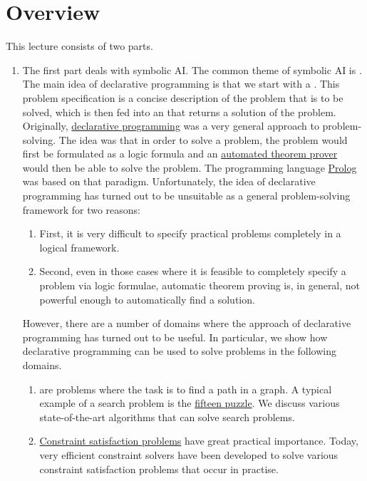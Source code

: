 \section{Overview}
This lecture consists of two parts.
\begin{enumerate}
\item The first part deals with symbolic AI.
      The common theme of symbolic AI is .  
      The main idea of declarative programming is that we start with a .
      This problem specification is a concise description of the problem that is to be solved, which is
      then fed into an  that returns a solution of the problem.  Originally, 
      \href{https://en.wikipedia.org/wiki/Declarative_programming}{declarative programming} was a very general
      approach to problem-solving.  The idea was that in order to solve a problem, the problem would first be
      formulated as a logic formula and an
      \href{https://en.wikipedia.org/wiki/Automated_theorem_proving}{automated theorem prover} would then be
      able to solve the problem.  The programming language \href{https://en.wikipedia.org/wiki/Prolog}{Prolog}
      was based on that paradigm.  Unfortunately, the idea of declarative programming has
      turned out to be unsuitable as a general problem-solving framework for two reasons:
      \begin{enumerate}
      \item First, it is very difficult to specify practical problems completely in a logical framework.
      \item Second, even in those cases where it is feasible to completely specify a problem via logic formulae,
            automatic theorem proving is, in general, not powerful enough to automatically find a solution. 
      \end{enumerate}
      However, there are a number of domains where the approach of declarative programming has turned out to be
      useful.  In particular, we show how declarative programming can be used to solve problems in the
      following domains.
      \begin{enumerate}
      \item {} are problems where the task is to find a path in a graph.  A typical example of a
            search problem is the \href{https://en.wikipedia.org/wiki/15_puzzle}{fifteen puzzle}.
            We discuss various state-of-the-art algorithms that can solve search problems.
      \item \href{https://en.wikipedia.org/wiki/Constraint_satisfaction_problem}{Constraint satisfaction problems} 
            have great practical importance.  Today, very efficient constraint solvers have been developed to
            solve various constraint satisfaction problems that occur in practise.


\end{enumerate}
\end{enumerate}
